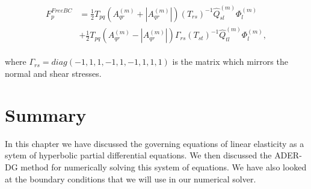 \begin{align}
    \begin{split}
    F_{p}^{FreeBC} &= \frac{1}{2}T_{pq}\left(A_{qr}^{\left(m\right)} + \left|A_{qr}^{\left(m\right)}\right|\right) \left(T_{rs}\right)^{-1} \hat{Q}_{sl}^{\left(m\right)} \Phi_l^{\left(m\right)}
    \\ &+ \frac{1}{2} T_{pq} \left(A_{qr}^{\left(m\right)} - \left|A_{qr}^{\left(m\right)}\right|\right) \Gamma_{rs} \left(T_{st}\right)^{-1} \hat{Q}_{tl}^{\left(m\right)} \Phi_l^{\left(m\right)} ,
    \end{split}
\end{align}

where $\Gamma_{rs} = diag\left(-1,1,1,-1,1,-1,1,1,1\right)$ is the matrix which mirrors the normal and shear stresses.

\section{Summary}
In this chapter we have discussed the governing equations of linear elasticity as a sytem of hyperbolic partial differential equations. We then discussed the 
\ac{ADER}-\ac{DG} method for numerically solving this system of equations. We have also looked at the boundary conditions that we will use in our numerical solver.
